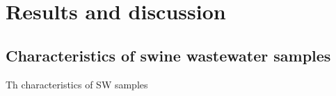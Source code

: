 \section{Results and discussion}
\subsection{Characteristics of swine wastewater samples}
Th characteristics of SW samples